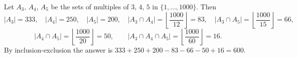 Let $A_3$, $A_4$, $A_5$ be the sets of multiples of $3$, $4$, $5$ in $\{1,\dots,1000\}$. Then
\[|A_3|=333,\quad|A_4|=250,\quad|A_5|=200,\quad |A_3\cap A_4|=\left\lfloor\dfrac{1000}{12}\right\rfloor=83,\quad|A_3\cap A_5|=\left\lfloor\dfrac{1000}{15}\right\rfloor=66,\]
\[|A_4\cap A_5|=\left\lfloor\dfrac{1000}{20}\right\rfloor=50,\qquad|A_3\cap A_4\cap A_5|=\left\lfloor\dfrac{1000}{60}\right\rfloor=16 .\]
By inclusion-exclusion the answer is $333+250+200-83-66-50+16=\boxed{600}$.
